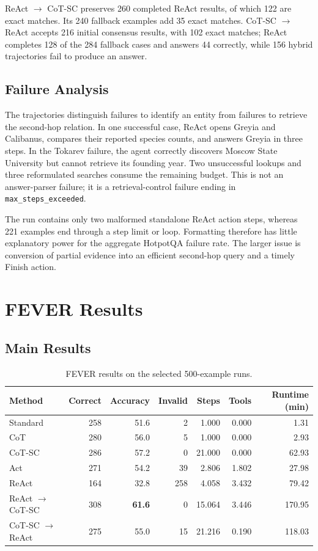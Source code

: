 \documentclass[10pt]{article}
\newcommand{\code}[1]{\texttt{#1}}
\begin{document}
ReAct $\rightarrow$ CoT-SC preserves 260 completed ReAct results, of which 122 are exact matches. Its 240 fallback examples add 35 exact matches. CoT-SC $\rightarrow$ ReAct accepts 216 initial consensus results, with 102 exact matches; ReAct completes 128 of the 284 fallback cases and answers 44 correctly, while 156 hybrid trajectories fail to produce an answer.

\subsection{Failure Analysis}

The trajectories distinguish failures to identify an entity from failures to retrieve the second-hop relation. In one successful case, ReAct opens Greyia and Calibanus, compares their reported species counts, and answers Greyia in three steps. In the Tokarev failure, the agent correctly discovers Moscow State University but cannot retrieve its founding year. Two unsuccessful lookups and three reformulated searches consume the remaining budget. This is not an answer-parser failure; it is a retrieval-control failure ending in \code{max\_steps\_exceeded}.

The run contains only two malformed standalone ReAct action steps, whereas 221 examples end through a step limit or loop. Formatting therefore has little explanatory power for the aggregate HotpotQA failure rate. The larger issue is conversion of partial evidence into an efficient second-hop query and a timely Finish action.

\section{FEVER Results}

\subsection{Main Results}

\begin{table}[htbp]
\centering
\caption{FEVER results on the selected 500-example runs.}
\label{tab:fever-main}
\small
\begin{tabular}{lrrrrrr}
\toprule
Method & Correct & Accuracy & Invalid & Steps & Tools & Runtime (min) \\
\midrule
Standard & 258 & 51.6 & 2 & 1.000 & 0.000 & 1.31 \\
CoT & 280 & 56.0 & 5 & 1.000 & 0.000 & 2.93 \\
CoT-SC & 286 & 57.2 & 0 & 21.000 & 0.000 & 62.93 \\
Act & 271 & 54.2 & 39 & 2.806 & 1.802 & 27.98 \\
ReAct & 164 & 32.8 & 258 & 4.058 & 3.432 & 79.42 \\
ReAct $\rightarrow$ CoT-SC & 308 & \textbf{61.6} & 0 & 15.064 & 3.446 & 170.95 \\
CoT-SC $\rightarrow$ ReAct & 275 & 55.0 & 15 & 21.216 & 0.190 & 118.03 \\
\bottomrule
\end{tabular}
\end{table}
\end{document}
